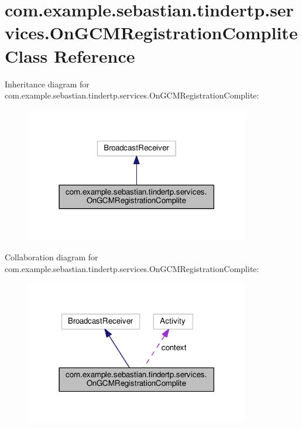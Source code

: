 \hypertarget{classcom_1_1example_1_1sebastian_1_1tindertp_1_1services_1_1OnGCMRegistrationComplite}{}\section{com.\+example.\+sebastian.\+tindertp.\+services.\+On\+G\+C\+M\+Registration\+Complite Class Reference}
\label{classcom_1_1example_1_1sebastian_1_1tindertp_1_1services_1_1OnGCMRegistrationComplite}


Inheritance diagram for com.\+example.\+sebastian.\+tindertp.\+services.\+On\+G\+C\+M\+Registration\+Complite\+:\nopagebreak
\begin{figure}[H]
\begin{center}
\leavevmode
\includegraphics[width=278pt]{classcom_1_1example_1_1sebastian_1_1tindertp_1_1services_1_1OnGCMRegistrationComplite__inherit__graph}
\end{center}
\end{figure}


Collaboration diagram for com.\+example.\+sebastian.\+tindertp.\+services.\+On\+G\+C\+M\+Registration\+Complite\+:\nopagebreak
\begin{figure}[H]
\begin{center}
\leavevmode
\includegraphics[width=278pt]{classcom_1_1example_1_1sebastian_1_1tindertp_1_1services_1_1OnGCMRegistrationComplite__coll__graph}
\end{center}
\end{figure}
